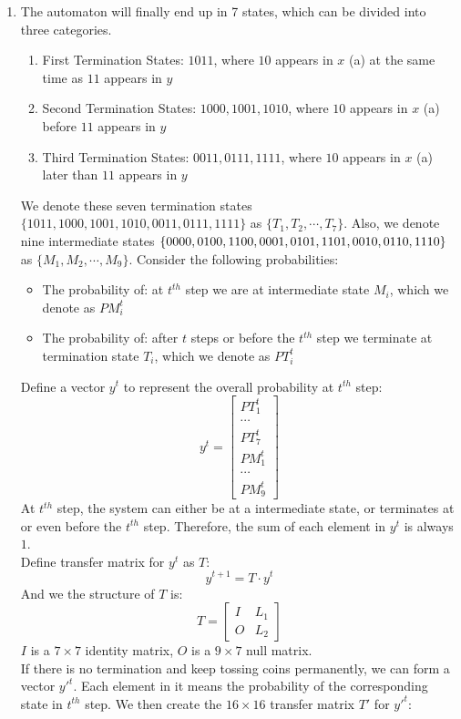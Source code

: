 \documentclass[12pt,a4]{article}
\begin{document}
\begin{solution}
\begin{enumerate}
  \item The automaton will finally end up in 7 states, which can be divided into three categories.
\begin{enumerate}
  \item First Termination States: $1011$, where $10$ appears in $x$ (a) at the same time as $11$ appears in $y$
  \item Second Termination States: $1000, 1001, 1010$, where $10$ appears in $x$ (a) before $11$ appears in $y$
  \item Third Termination States: $0011, 0111, 1111$, where $10$ appears in $x$ (a) later than $11$ appears in $y$
\end{enumerate}
We denote these seven termination states $\{1011,1000,1001,1010,0011,0111,1111\}$ as $\{T_1, T_2, \cdots, T_7\}$. Also, we denote nine intermediate states $\{0000,0100,1100,0001\\,0101,1101,0010,0110,1110\}$ as $\{M_1, M_2, \cdots, M_9\}$. Consider the following probabilities: 
\begin{itemize}
  \item The probability of: at $t^{th}$ step we are at intermediate state $M_i$, which we denote as ${PM}_i^t$
  \item The probability of: after $t$ steps or before the $t^{th}$ step we terminate at termination state $T_i$, which we denote as ${PT}_i^t$
\end{itemize}
Define a vector $y^t$ to represent the overall probability at $t^{th}$ step:
$$y^t = \begin{bmatrix}PT_1^t\\\cdots\\PT_7^t\\PM_1^t\\\cdots\\PM_9^t \end{bmatrix}$$
At $t^{th}$ step, the system can either be at a intermediate state, or terminates at or even before the $t^{th}$ step. Therefore, the sum of each element in $y^t$ is always $1$.\\
Define transfer matrix for $y^t$ as $T$:
$$y^{t+1}=T\cdot y^t$$
And we the structure of $T$ is:
$$T = \begin{bmatrix}I&L_1\\O&L_2\end{bmatrix}$$
$I$ is a $7\times 7$ identity matrix, $O$ is a $9\times 7$ null matrix.\\
If there is no termination and keep tossing coins permanently, we can form a vector $y'^t$. Each element in it means the probability of the corresponding state in $t^{th}$ step. We then create the $16\times 16$ transfer matrix $T'$ for $y'^t$:

\end{enumerate}
\end{solution}
\end{document}
